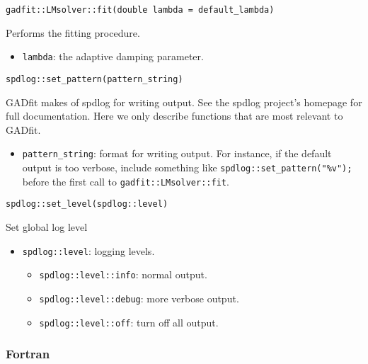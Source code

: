\documentclass{article}
\begin{document}
\begin{verbatim}
gadfit::LMsolver::fit(double lambda = default_lambda)
\end{verbatim}
Performs the fitting procedure.
\begin{itemize}
\item \verb+lambda+: the adaptive damping parameter.
\end{itemize}

\begin{verbatim}
spdlog::set_pattern(pattern_string)
\end{verbatim}
GADfit makes of spdlog for writing output. See the spdlog project's homepage for full documentation. Here we only describe functions that are most relevant to GADfit.
\begin{itemize}
\item \verb+pattern_string+: format for writing output. For instance, if the default output is too verbose, include something like \verb+spdlog::set_pattern("%v");+ before the first call to \verb+gadfit::LMsolver::fit+.
\end{itemize}

\begin{verbatim}
spdlog::set_level(spdlog::level)
\end{verbatim}
Set global log level
\begin{itemize}
\item \verb+spdlog::level+: logging levels.
  \begin{itemize}
  \item \verb+spdlog::level::info+: normal output.
  \item \verb+spdlog::level::debug+: more verbose output.
  \item \verb+spdlog::level::off+: turn off all output.
  \end{itemize}
\end{itemize}

\subsubsection{\label{sec:input_fortran}Fortran}
\end{document}

